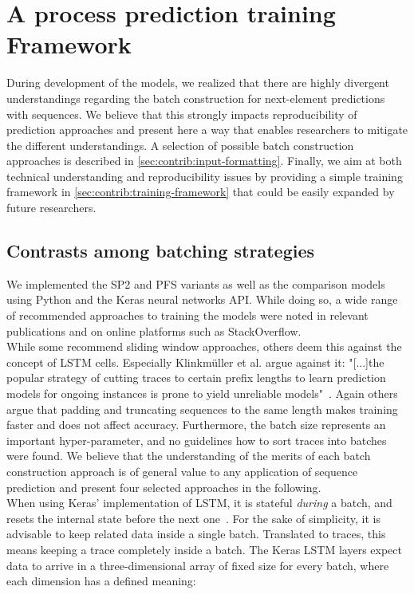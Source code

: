 \chapter{A process prediction training Framework}
\label{chap:training-framework}
During development of the models, we realized that there are highly divergent understandings regarding the batch construction for next-element predictions with sequences. We believe that this strongly impacts reproducibility of prediction approaches and present here a way that enables researchers to mitigate the different understandings. A selection of possible batch construction approaches is described in \autoref{sec:contrib:input-formatting}. Finally, we aim at both technical understanding and reproducibility issues by providing a simple training framework in \autoref{sec:contrib:training-framework} that could be easily expanded by future researchers.

\section{Contrasts among batching strategies}
\label{sec:contrib:input-formatting}
We implemented the SP2 and PFS variants as well as the comparison models using Python and the Keras neural networks API. While doing so, a wide range of recommended approaches to training the models were noted in relevant publications and on online platforms such as StackOverflow.\\

While some recommend sliding window approaches, others deem this against the concept of LSTM cells. Especially Klinkmüller et al. argue against it: "[...]the popular strategy of cutting traces to certain prefix lengths to learn prediction models for ongoing instances is prone to yield unreliable models"~\cite{klinkmuller2018reliablemonitoring}. Again others argue that padding and truncating sequences to the same length makes training faster and does not affect accuracy. Furthermore, the batch size represents an important hyper-parameter, and no guidelines how to sort traces into batches were found. We believe that the understanding of the merits of each batch construction approach is of general value to any application of sequence prediction and present four selected approaches in the following.\\

When using Keras' implementation of LSTM, it is stateful \textit{during} a batch, and resets the internal state before the next one~\cite{web:keras}. For the sake of simplicity, it is advisable to keep related data inside a single batch. Translated to traces, this means keeping a trace completely inside a batch. The Keras LSTM layers expect data to arrive in a three-dimensional array of fixed size for every batch, where each dimension has a defined meaning:

